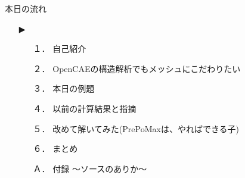 \begin{frame}{本日の流れ}
  \begin{itemize}
      \item[▶] 
    \begin{enumerate}[label=\textbf{ \arabic*.},itemsep=1.3ex, leftmargin=1cm]
        \item[１．] 自己紹介
        \item[２．] OpenCAEの構造解析でもメッシュにこだわりたい
        \item[３．] 本日の例題
        \item[４．] 以前の計算結果と指摘
        \item[５．] 改めて解いてみた(PrePoMaxは、やればできる子)
        \item[６．] まとめ
        \item[Ａ．] 付録 ～ソースのありか～
    \end{enumerate}
  \end{itemize}
\end{frame}
